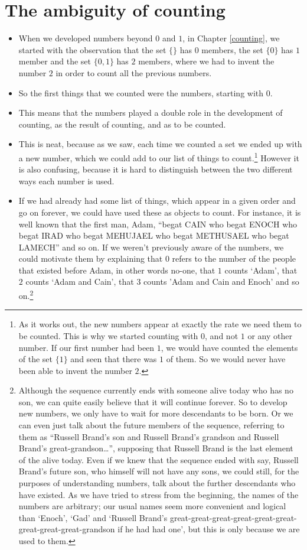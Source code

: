 \chapter{The ambiguity of counting}
\label{ambiguity}

\begin{itemize}
\item
When we developed numbers beyond $0$ and $1$, in Chapter \ref{counting}, we started with the observation that the set $\{\}$ has $0$ members, the set $\{0\}$ has $1$ member and the set $\{0,1\}$ has $2$ members, where we had to invent the number $2$ in order to count all the previous numbers.
\item
So the first things that we counted were the numbers, starting with $0$.
\item
This means that the numbers played a double role in the development of counting, as the result of counting, and as  to be counted.
\item
This is neat, because as we saw, each time we counted a set we ended up with a new number, which we could add to our list of things to count.\footnote{As it works out, the new numbers appear at exactly the rate we need them to be counted. This is why we started counting with $0$, and not $1$ or any other number. If our first number had been $1$, we would have counted the elements of the set $\{1\}$ and seen that there was $1$ of them. So we would never have been able to invent the number $2$.} However it is also confusing, because it is hard to distinguish between the two different ways each number is used.
\item
If we had already had some list of things, which appear in a given order and go on forever, we could have used these as objects to count. For instance, it is well known that the first man, Adam, ``begat CAIN who begat ENOCH who begat IRAD who begat MEHUJAEL who begat METHUSAEL who begat LAMECH'' and so on. If we weren't previously aware of the numbers, we could motivate them by explaining that $0$ refers to the number of the people that existed before Adam, in other words no-one, that $1$ counts `Adam', that $2$ counts `Adam and Cain', that $3$ counts 'Adam and Cain and Enoch' and so on.\footnote{Although the sequence currently ends with someone alive today who has no son, we can quite easily believe that it will continue forever. So to develop new numbers, we only have to wait for more descendants to be born. Or we can even just talk about the future members of the sequence, referring to them as ``Russell Brand's son and Russell Brand's grandson and Russell Brand's great-grandson\ldots'', supposing that Russell Brand is the last element of the  alive today. Even if we knew that the sequence ended with say, Russell Brand's future son, who himself will not have any sons, we could still, for the purposes of understanding numbers, talk about the further descendants who  have existed.  As we have tried to stress from the beginning, the names of the numbers are arbitrary; our usual names seem more convenient and logical than `Enoch', `Gad' and `Russell Brand's great-great-great-great-great-great-great-great-great-grandson if he had had one', but this is  only because we are used to them.}

\end{itemize}
